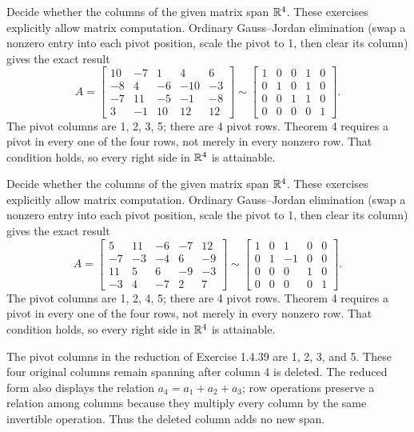\goal Decide whether the columns of the given matrix span $\mathbb{R}^4$.
These exercises explicitly allow matrix computation. Ordinary
Gauss--Jordan elimination (swap a nonzero entry into each pivot position,
scale the pivot to 1, then clear its column) gives the exact result
\[A=\left[\begin{matrix}10 & -7 & 1 & 4 & 6\\-8 & 4 & -6 & -10 & -3\\-7 & 11 & -5 & -1 & -8\\3 & -1 & 10 & 12 & 12\end{matrix}\right]\sim\left[\begin{matrix}1 & 0 & 0 & 1 & 0\\0 & 1 & 0 & 1 & 0\\0 & 0 & 1 & 1 & 0\\0 & 0 & 0 & 0 & 1\end{matrix}\right].\]
The pivot columns are 1, 2, 3, 5; there are 4 pivot rows.
Theorem 4 requires a pivot in every one of the four rows, not merely
in every nonzero row. That condition holds, so every right side
in $\mathbb{R}^4$ is attainable.

\goal Decide whether the columns of the given matrix span $\mathbb{R}^4$.
These exercises explicitly allow matrix computation. Ordinary
Gauss--Jordan elimination (swap a nonzero entry into each pivot position,
scale the pivot to 1, then clear its column) gives the exact result
\[A=\left[\begin{matrix}5 & 11 & -6 & -7 & 12\\-7 & -3 & -4 & 6 & -9\\11 & 5 & 6 & -9 & -3\\-3 & 4 & -7 & 2 & 7\end{matrix}\right]\sim\left[\begin{matrix}1 & 0 & 1 & 0 & 0\\0 & 1 & -1 & 0 & 0\\0 & 0 & 0 & 1 & 0\\0 & 0 & 0 & 0 & 1\end{matrix}\right].\]
The pivot columns are 1, 2, 4, 5; there are 4 pivot rows.
Theorem 4 requires a pivot in every one of the four rows, not merely
in every nonzero row. That condition holds, so every right side
in $\mathbb{R}^4$ is attainable.

The pivot columns in the reduction of Exercise 1.4.39 are 1, 2, 3,
and 5. These four original columns remain spanning after column 4
is deleted. The reduced form also displays the relation
$a_4=a_1+a_2+a_3$; row operations preserve a relation among columns
because they multiply every column by the same invertible operation.
Thus the deleted column adds no new span.


